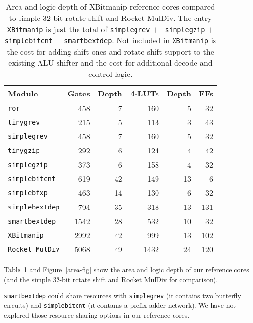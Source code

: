 \begin{table}[h]
\begin{center}
\begin{tabular}{l|rr|rr|r}
Module & Gates & Depth & 4-LUTs & Depth & FFs \\
\hline
{\tt ror} & 458 & 7 & 160 & 5 & 32 \\
\hline
{\tt tinygrev} & 215 & 5 & 113 & 3 & 43 \\
{\tt simplegrev} & 458 & 7 & 160 & 5 & 32 \\
\hline
{\tt tinygzip} & 292 & 6 & 124 & 4 & 42 \\
{\tt simplegzip} & 373 & 6 & 158 & 4 & 32 \\
\hline
{\tt simplebitcnt} & 619 & 42 & 149 & 13 & 6 \\
\hline
{\tt simplebfxp} & 463 & 14 & 130 & 6 & 32 \\
\hline
{\tt simplebextdep} & 794 & 35 & 318 & 13 & 131 \\
{\tt smartbextdep} & 1542 & 28 & 532 & 10 & 32 \\
\hline
{\tt XBitmanip} & 2992 & 42 & 999 & 13 & 102 \\
{\tt Rocket MulDiv} & 5068 & 49 & 1432 & 24 & 120 \\
\end{tabular}
\end{center}
\caption{Area and logic depth of XBitmanip reference cores compared to simple 32-bit rotate
shift and Rocket MulDiv. The entry {\tt XBitmanip} is just the total of {\tt simplegrev} $+$ {\tt
simplegzip} $+$ {\tt simplebitcnt} $+$ {\tt smartbextdep}. Not included in {\tt XBitmanip} is the
cost for adding shift-ones and rotate-shift support to the existing ALU shifter
and the cost for additional decode and control logic.}
\label{area-tab}
\end{table}

Table~\ref{area-tab} and Figure~\ref{area-fig} show the area and logic depth of
our reference cores (and the simple 32-bit rotate shift and Rocket MulDiv for
comparison).

{\tt smartbextdep} could share resources with {\tt simplegrev} (it contains
two butterfly circuits) and {\tt simplebitcnt} (it contains a prefix adder network).
We have not explored those resource sharing options in our reference cores.
